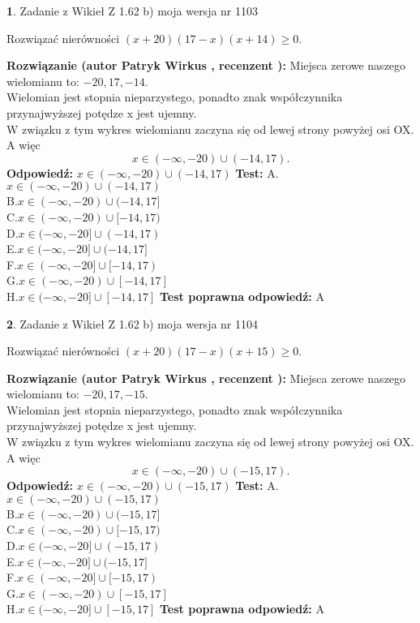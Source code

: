 \documentclass[12pt, a4paper]{article}
\theoremstyle{definition} %
\newtheorem{zad}{}
\newcommand{\zadStart}[1]{\begin{zad}#1\newline}
\newcommand{\zadStop}{\end{zad}}
\newcommand{\rozwStart}[2]{\noindent \textbf{Rozwiązanie (autor #1 , recenzent #2): }\newline}
\newcommand{\rozwStop}{\newline}
\newcommand{\odpStart}{\noindent \textbf{Odpowiedź:}\newline}
\newcommand{\odpStop}{\newline}
\newcommand{\testStart}{\noindent \textbf{Test:}\newline}
\newcommand{\testStop}{\newline}
\newcommand{\kluczStart}{\noindent \textbf{Test poprawna odpowiedź:}\newline}
\newcommand{\kluczStop}{\newline}
\begin{document}
\zadStart{Zadanie z Wikieł Z 1.62 b) moja wersja nr 1103}

Rozwiązać nierówności $(x+20)(17-x)(x+14)\ge0$.
\zadStop
\rozwStart{Patryk Wirkus}{}
Miejsca zerowe naszego wielomianu to: $-20, 17, -14$.\\
Wielomian jest stopnia nieparzystego, ponadto znak współczynnika przy\linebreak najwyższej potędze x jest ujemny.\\ W związku z tym wykres wielomianu zaczyna się od lewej strony powyżej osi OX. A więc $$x \in (-\infty,-20) \cup (-14,17).$$
\rozwStop
\odpStart
$x \in (-\infty,-20) \cup (-14,17)$
\odpStop
\testStart
A.$x \in (-\infty,-20) \cup (-14,17)$\\
B.$x \in (-\infty,-20) \cup (-14,17]$\\
C.$x \in (-\infty,-20) \cup [-14,17)$\\
D.$x \in (-\infty,-20] \cup (-14,17)$\\
E.$x \in (-\infty,-20] \cup (-14,17]$\\
F.$x \in (-\infty,-20] \cup [-14,17)$\\
G.$x \in (-\infty,-20) \cup [-14,17]$\\
H.$x \in (-\infty,-20] \cup [-14,17]$
\testStop
\kluczStart
A
\kluczStop



\zadStart{Zadanie z Wikieł Z 1.62 b) moja wersja nr 1104}

Rozwiązać nierówności $(x+20)(17-x)(x+15)\ge0$.
\zadStop
\rozwStart{Patryk Wirkus}{}
Miejsca zerowe naszego wielomianu to: $-20, 17, -15$.\\
Wielomian jest stopnia nieparzystego, ponadto znak współczynnika przy\linebreak najwyższej potędze x jest ujemny.\\ W związku z tym wykres wielomianu zaczyna się od lewej strony powyżej osi OX. A więc $$x \in (-\infty,-20) \cup (-15,17).$$
\rozwStop
\odpStart
$x \in (-\infty,-20) \cup (-15,17)$
\odpStop
\testStart
A.$x \in (-\infty,-20) \cup (-15,17)$\\
B.$x \in (-\infty,-20) \cup (-15,17]$\\
C.$x \in (-\infty,-20) \cup [-15,17)$\\
D.$x \in (-\infty,-20] \cup (-15,17)$\\
E.$x \in (-\infty,-20] \cup (-15,17]$\\
F.$x \in (-\infty,-20] \cup [-15,17)$\\
G.$x \in (-\infty,-20) \cup [-15,17]$\\
H.$x \in (-\infty,-20] \cup [-15,17]$
\testStop
\kluczStart
A
\kluczStop
\end{document}
